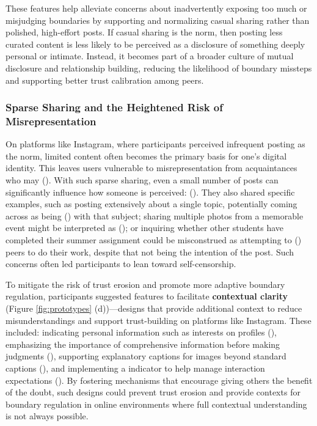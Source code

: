 These features help alleviate concerns about inadvertently exposing too much or misjudging boundaries by supporting and normalizing casual sharing rather than polished, high-effort posts. If casual sharing is the norm, then posting less curated content is less likely to be perceived as a disclosure of something deeply personal or intimate. Instead, it becomes part of a broader culture of mutual disclosure and relationship building, reducing the likelihood of boundary missteps and supporting better trust calibration among peers.



\subsubsection{Sparse Sharing and the Heightened Risk of Misrepresentation}
\label{section:4-3-2}
On platforms like Instagram, where participants perceived infrequent posting as the norm, limited content often becomes the primary basis for one's digital identity. This leaves users vulnerable to misrepresentation from acquaintances who may  (). With such sparse sharing, even a small number of posts can significantly influence how someone is perceived:  (). They also shared specific examples, such as posting extensively about a single topic, potentially coming across as being  () with that subject; sharing multiple photos from a memorable event might be interpreted as  (); or inquiring whether other students have completed their summer assignment could be misconstrued as attempting to  () peers to do their work, despite that not being the intention of the post. Such concerns often led participants to lean toward self-censorship.

To mitigate the risk of trust erosion and promote more adaptive boundary regulation, participants suggested features to facilitate \textbf{contextual clarity} (Figure \ref{fig:prototypes} (d))---designs that provide additional context to reduce misunderstandings and support trust-building on platforms like Instagram. These included: indicating personal information such as interests on profiles (), emphasizing the importance of comprehensive information before making judgments (), supporting explanatory captions for images beyond standard captions (), and implementing a  indicator to help manage interaction expectations (). By fostering mechanisms that encourage giving others the benefit of the doubt, such designs could prevent trust erosion and provide contexts for boundary regulation in online environments where full contextual understanding is not always possible.



